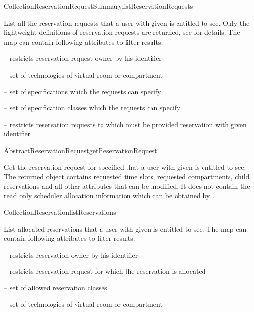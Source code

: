 \begin{Api}
\begin{ApiCmdCollection}{Collection}{ReservationRequestSummary}{listReservationRequests}%
%
%
\end{ApiCmdCollection}
List all the reservation requests that a user with given  is entitled to see. Only the lightweight definitions of reservation requests are returned, see  for details. The  map can contain following attributes to filter results:
\begin{compactitem}
\item {} -- restricts reservation request owner by his identifier
\item {} -- set of technologies of virtual room or compartment
\item {} -- set of specifications which the requests can specify
\item {} -- set of specification classes which the requests can specify
\item {} -- restricts reservation requests to which must be provided reservation with given identifier
\end{compactitem}

\begin{ApiCmd}{AbstractReservationRequest}{getReservationRequest}%
%
%
\end{ApiCmd}
Get the reservation request for specified  that a user with given  is entitled to see. The returned object contains requested time slots, requested compartments, child reservations and all other attributes that can be modified. It does not contain the read only scheduler allocation information which can be obtained by .

\begin{ApiCmdCollection}{Collection}{Reservation}{listReservations}%
%
%
\end{ApiCmdCollection}
List allocated reservations that a user with given  is entitled to see.
The  map can contain following attributes to filter results:
\begin{compactitem}
\item {} -- restricts reservation owner by his identifier
\item {} -- restricts reservation request for which the reservation is allocated
\item {} -- set of allowed reservation classes
\item {} -- set of technologies of virtual room or compartment
\end{compactitem}


\end{Api}
